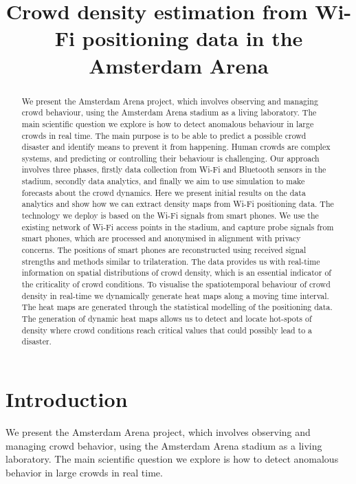 \documentclass[10pt,a4paper]{article}
\begin{document}
\title{Crowd density estimation from Wi-Fi positioning data in the Amsterdam Arena}
\maketitle

\begin{abstract}
We present the Amsterdam Arena project, which involves observing and managing crowd behaviour, using the Amsterdam Arena stadium as a living laboratory. The main scientific question we explore is how to detect anomalous behaviour in large crowds in real time. The main purpose is to be able to predict a possible crowd disaster and identify means to prevent it from happening. 
Human crowds are complex systems, and predicting or controlling their behaviour is challenging. Our approach involves three phases, firstly data collection from Wi-Fi and Bluetooth sensors in the stadium, secondly data analytics, and finally we aim to use simulation to make forecasts about the crowd dynamics. 
Here we present initial results on the data analytics and show how we can extract density maps from Wi-Fi positioning data. The technology we deploy is based on the Wi-Fi signals from smart phones. We use the existing network of Wi-Fi access points in the stadium, and capture probe signals from smart phones, which are processed and anonymised in alignment with privacy concerns. The positions of smart phones are reconstructed using received signal strengths and methods similar to trilateration. The data provides us with real-time information on spatial distributions of crowd density, which is an essential indicator of the criticality of crowd conditions. To visualise the spatiotemporal behaviour of crowd density in real-time we dynamically generate heat maps along a moving time interval. The heat maps are generated through the statistical modelling of the positioning data. The generation of dynamic heat maps allows us to detect and locate hot-spots of density where crowd conditions reach critical values that could possibly lead to a disaster.
\end{abstract}

\section{Introduction}

We present the Amsterdam Arena project, which involves observing and managing crowd behavior, using the Amsterdam Arena stadium as a living laboratory. The main scientific question we explore is how to detect anomalous behavior in large crowds in real time. 
\end{document}
